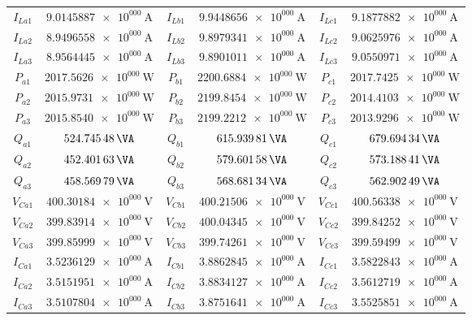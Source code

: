 \documentclass[letterpaper,oneside,onecolumn,draftclsnofoot,12pt,conference]{IEEEtran}
\begin{document}
\begin{table}[ht]
\begin{minipage}[b]{0.45\textwidth}
{\begin{tabular}{cc|cc|cc}
 					$I_{La1}$&$\SI{9.0145887e+000}{\A}$&  $I_{Lb1}$&$\SI{9.9448656e+000}{\A}$& $I_{Lc1}$&$\SI{9.1877882e+000}{\A}$ \\
 					$I_{La2}$&$\SI{8.9496558e+000}{\A}$&  $I_{Lb2}$&$\SI{9.8979341e+000}{\A}$& $I_{Lc2}$&$\SI{9.0625976e+000}{\A}$ \\
 					$I_{La3}$&$\SI{8.9564445e+000}{\A}$&  $I_{Lb3}$&$\SI{9.8901011e+000}{\A}$& $I_{Lc3}$&$\SI{9.0550971e+000}{\A}$ \\
 					$P_{a1}$& $\SI{2017.5626e+000}{\W}$&  $P_{b1}$& $\SI{2200.6884e+000}{\W}$& $P_{c1}$& $\SI{2017.7425e+000}{\W}$ \\
 					$P_{a2}$& $\SI{2015.9731e+000}{\W}$&  $P_{b2}$& $\SI{2199.8454e+000}{\W}$& $P_{c2}$& $\SI{2014.4103e+000}{\W}$ \\
 					$P_{a3}$& $\SI{2015.8540e+000}{\W}$&  $P_{b3}$& $\SI{2199.2212e+000}{\W}$& $P_{c3}$& $\SI{2013.9296e+000}{\W}$ \\
 					$Q_{a1}$& $\SI{524.74548e+000}{\VA}$&  $Q_{b1}$& $\SI{615.93981e+000}{\VA}$& $Q_{c1}$& $\SI{679.69434e+000}{\VA}$ \\
 					$Q_{a2}$& $\SI{452.40163e+000}{\VA}$&  $Q_{b2}$& $\SI{579.60158e+000}{\VA}$& $Q_{c2}$& $\SI{573.18841e+000}{\VA}$ \\
 					$Q_{a3}$& $\SI{458.56979e+000}{\VA}$&  $Q_{b3}$& $\SI{568.68134e+000}{\VA}$& $Q_{c3}$& $\SI{562.90249e+000}{\VA}$ \\
 					$V_{Ca1}$&$\SI{400.30184e+000}{\V}$&  $V_{Cb1}$&$\SI{400.21506e+000}{\V}$& $V_{Cc1}$&$\SI{400.56338e+000}{\V}$ \\
 					$V_{Ca2}$&$\SI{399.83914e+000}{\V}$&  $V_{Cb2}$&$\SI{400.04345e+000}{\V}$& $V_{Cc2}$&$\SI{399.84252e+000}{\V}$ \\
 					$V_{Ca3}$&$\SI{399.85999e+000}{\V}$&  $V_{Cb3}$&$\SI{399.74261e+000}{\V}$& $V_{Cc3}$&$\SI{399.59499e+000}{\V}$ \\
 					$I_{Ca1}$&$\SI{3.5236129e+000}{\A}$&  $I_{Cb1}$&$\SI{3.8862845e+000}{\A}$& $I_{Cc1}$&$\SI{3.5822843e+000}{\A}$ \\
 					$I_{Ca2}$&$\SI{3.5151951e+000}{\A}$&  $I_{Cb2}$&$\SI{3.8834127e+000}{\A}$& $I_{Cc2}$&$\SI{3.5612719e+000}{\A}$ \\
 					$I_{Ca3}$&$\SI{3.5107804e+000}{\A}$&  $I_{Cb3}$&$\SI{3.8751641e+000}{\A}$& $I_{Cc3}$&$\SI{3.5525851e+000}{\A}$ \\
 					\bottomrule                                                                                          
 				\end{tabular}}
 			\end{minipage}
 		\end{table}
 		
\end{document}

